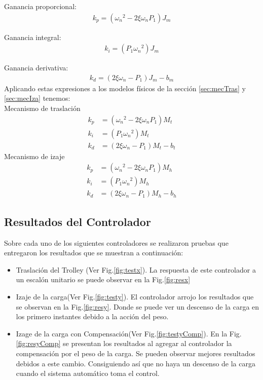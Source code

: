 \documentclass[journal]{IEEEtran}
\begin{document}
Ganancia proporcional: 
\begin{align}
  k_p = ({{\omega}_n}^2 - 2 \xi {\omega}_n P_1) J_m
\end{align}

Ganancia integral:
\begin{align}
  k_i = (P_1 {{\omega}_n}^2) J_m
\end{align}

Ganancia derivativa:
\begin{align}
  k_d = (2 \xi {\omega}_n - P_1) J_m - b_m
\end{align}
Aplicando estas expresiones a los modelos físicos de la sección \ref{sec:mecTras} y 
\ref{sec:mecIza} tenemos:\\
Mecanismo de traslación
\begin{align}
  k_p &= ({{\omega}_n}^2 - 2 \xi {\omega}_n P_1) M_t\\
  k_i &= (P_1 {{\omega}_n}^2) M_t\\
  k_d &= (2 \xi {\omega}_n - P_1) M_t - b_t
\end{align}
Mecanismo de izaje
\begin{align}
  k_p &= ({{\omega}_n}^2 - 2 \xi {\omega}_n P_1) M_h\\
  k_i &= (P_1 {{\omega}_n}^2) M_h\\
  k_d &= (2 \xi {\omega}_n - P_1) M_h - b_h
\end{align}

\subsection{Resultados del Controlador}
Sobre cada uno de los siguientes controladores se realizaron pruebas que
entregaron los resultados que se muestran a continuación:
\begin{itemize}
 \item Traslación del Trolley (Ver Fig.\ref{fig:testx}).
 La respuesta de este controlador a un escalón unitario se puede
 observar en la Fig.\ref{fig:resx}
 \item Izaje de la carga(Ver Fig.\ref{fig:testy}).
 El controlador arrojo los resultados que se observan en la Fig.\ref{fig:resy}. 
 Donde se puede ver un descenso de la carga en los primero instantes debido a la 
 acción del peso.
 \item Izage de la carga con Compensación(Ver Fig.\ref{fig:testyComp}).
 En la Fig.\ref{fig:resyComp} se presentan los resultados al agregar al
 controlador la compensación por el peso de la carga. Se pueden observar mejores
 resultados debidos a este cambio. Consiguiendo así que no haya un descenso de la
 carga cuando el sistema automático toma el control.
\end{itemize}
\end{document}
